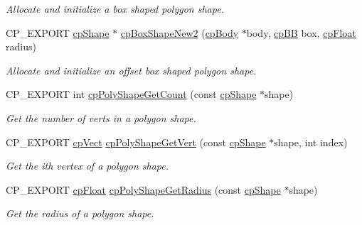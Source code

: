 \begin{DoxyCompactItemize}
\begin{DoxyCompactList}\small\item\em Allocate and initialize a box shaped polygon shape. \end{DoxyCompactList}\item 
\mbox{\label{group__cp_poly_shape_gaab674be6cd52c66c650f1e10df862d28}} 
C\+P\+\_\+\+E\+X\+P\+O\+RT \mbox{\hyperlink{structcp_shape}{cp\+Shape}} $\ast$ \mbox{\hyperlink{group__cp_poly_shape_gaab674be6cd52c66c650f1e10df862d28}{cp\+Box\+Shape\+New2}} (\mbox{\hyperlink{structcp_body}{cp\+Body}} $\ast$body, \mbox{\hyperlink{structcp_b_b}{cp\+BB}} box, \mbox{\hyperlink{group__basic_types_gac1ed65573e035bf892505768c852d8d3}{cp\+Float}} radius)
\begin{DoxyCompactList}\small\item\em Allocate and initialize an offset box shaped polygon shape. \end{DoxyCompactList}\item 
\mbox{\label{group__cp_poly_shape_gaa6ae842d55ceb9865e6e80bc1db9634d}} 
C\+P\+\_\+\+E\+X\+P\+O\+RT int \mbox{\hyperlink{group__cp_poly_shape_gaa6ae842d55ceb9865e6e80bc1db9634d}{cp\+Poly\+Shape\+Get\+Count}} (const \mbox{\hyperlink{structcp_shape}{cp\+Shape}} $\ast$shape)
\begin{DoxyCompactList}\small\item\em Get the number of verts in a polygon shape. \end{DoxyCompactList}\item 
\mbox{\label{group__cp_poly_shape_gaff54ae9c1055cf5178aa5297c401f844}} 
C\+P\+\_\+\+E\+X\+P\+O\+RT \mbox{\hyperlink{structcp_vect}{cp\+Vect}} \mbox{\hyperlink{group__cp_poly_shape_gaff54ae9c1055cf5178aa5297c401f844}{cp\+Poly\+Shape\+Get\+Vert}} (const \mbox{\hyperlink{structcp_shape}{cp\+Shape}} $\ast$shape, int index)
\begin{DoxyCompactList}\small\item\em Get the {\ttfamily ith} vertex of a polygon shape. \end{DoxyCompactList}\item 
\mbox{\label{group__cp_poly_shape_gadaa9274e569afd49c025b2e12bb022d8}} 
C\+P\+\_\+\+E\+X\+P\+O\+RT \mbox{\hyperlink{group__basic_types_gac1ed65573e035bf892505768c852d8d3}{cp\+Float}} \mbox{\hyperlink{group__cp_poly_shape_gadaa9274e569afd49c025b2e12bb022d8}{cp\+Poly\+Shape\+Get\+Radius}} (const \mbox{\hyperlink{structcp_shape}{cp\+Shape}} $\ast$shape)
\begin{DoxyCompactList}\small\item\em Get the radius of a polygon shape. \end{DoxyCompactList}\end{DoxyCompactItemize}


